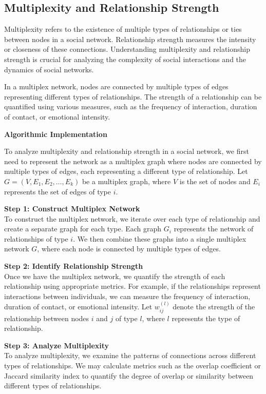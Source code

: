 \documentclass[12pt]{book} %
\begin{document}
\subsection{Multiplexity and Relationship Strength}

Multiplexity refers to the existence of multiple types of relationships or ties between nodes in a social network. Relationship strength measures the intensity or closeness of these connections. Understanding multiplexity and relationship strength is crucial for analyzing the complexity of social interactions and the dynamics of social networks.

In a multiplex network, nodes are connected by multiple types of edges representing different types of relationships. The strength of a relationship can be quantified using various measures, such as the frequency of interaction, duration of contact, or emotional intensity.

\textbf{Algorithmic Implementation}

To analyze multiplexity and relationship strength in a social network, we first need to represent the network as a multiplex graph where nodes are connected by multiple types of edges, each representing a different type of relationship. Let \(G = (V, E_1, E_2, \ldots, E_k)\) be a multiplex graph, where \(V\) is the set of nodes and \(E_i\) represents the set of edges of type \(i\).

\textbf{Step 1: Construct Multiplex Network}\\
To construct the multiplex network, we iterate over each type of relationship and create a separate graph for each type. Each graph \(G_i\) represents the network of relationships of type \(i\). We then combine these graphs into a single multiplex network \(G\), where each node is connected by multiple types of edges.

\textbf{Step 2: Identify Relationship Strength}\\
Once we have the multiplex network, we quantify the strength of each relationship using appropriate metrics. For example, if the relationships represent interactions between individuals, we can measure the frequency of interaction, duration of contact, or emotional intensity. Let \(w_{ij}^{(l)}\) denote the strength of the relationship between nodes \(i\) and \(j\) of type \(l\), where \(l\) represents the type of relationship.

\textbf{Step 3: Analyze Multiplexity}\\
To analyze multiplexity, we examine the patterns of connections across different types of relationships. We may calculate metrics such as the overlap coefficient or Jaccard similarity index to quantify the degree of overlap or similarity between different types of relationships.
\end{document}
